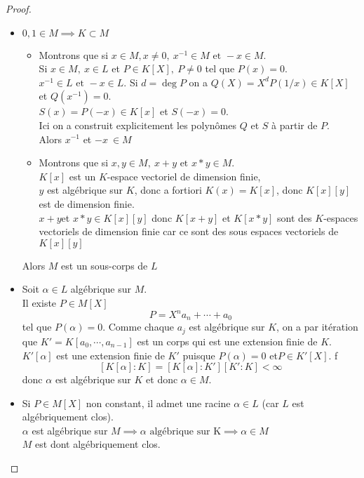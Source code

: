 \begin{proof}
	\begin{itemize}
		\item $0,1 \in M \implies K \subset M$ \\
		      \begin{itemize}
			      \item
			            Montrons que si $x \in M, x \neq 0, \  x^{-1} \in M \text{ et } -x \in M$. \\
			            Si $x \in M, \ x \in L$ et $P \in K[X], \ P \neq 0$ tel que $P (x) = 0$.\\
			            $x^{-1} \in L \text{ et } -x \in L$. Si $d = \deg P$ on a $Q(X) = X^d P(1/x) \in K[X]$ et $Q(x^{-1}) = 0$.\\
			            $S(x) = P(-x) \in K[x]$ et $S(-x) = 0$. \\
			            Ici on a construit explicitement les polynômes $Q$ et $S$ à partir de $P$.\\
			            Alors $x^{-1}$ et $-x \ \in M$
			      \item Montrons que si $x,y \in M, \  x + y \text{ et } x*y \in M$. \\
			            $K[x]$ est un $K$-espace vectoriel de dimension finie, \\
			            $y$ est algébrique sur $K$, donc a fortiori $K(x) =  K[x]$, donc $K[x][y]$ est de dimension finie.\\
			            $x+y $et $x*y\in K[x][y]$ donc $K[x+y]$ et $K[x*y]$ sont des $K$-espaces vectoriels de dimension finie car
			            ce sont des sous espaces vectoriels de $K[x][y]$
		      \end{itemize}
		      Alors $M$ est un sous-corps de $L$
		\item Soit $\alpha \in L$ algébrique sur $M$.\\
		      Il existe $P \in M[X]$
		      $$ P = X^na_n + \cdots + a_0$$
		      tel que $P(\alpha) = 0$. Comme chaque $a_j$ est algébrique sur $K$, on a par itération que $K'=K[a_0,\cdots, a_{n-1}]$ est un corps qui est une extension finie de $K$.\\
		      $K'[\alpha]$ est une extension finie de $K'$ puisque $P(\alpha)=0$ et$P \in K'[X]$. f
		      $$ \left[K[\alpha] : K\right]  =  \left[K[\alpha] : K'\right] \left[K' : K\right] < \infty $$
		      donc $\alpha$ est algébrique sur $K$ et donc $\alpha \in M$.
		\item
		      Si $P \in M[X]$ non constant, il admet une racine $\alpha \in L$ (car $L$ est algébriquement clos). \\
		      $\alpha$ est algébrique sur $M \implies \alpha \text{ algébrique sur K} \implies \alpha \in M$\ \\ %
		      $M$ est dont algébriquement clos.
	\end{itemize}
\end{proof}

